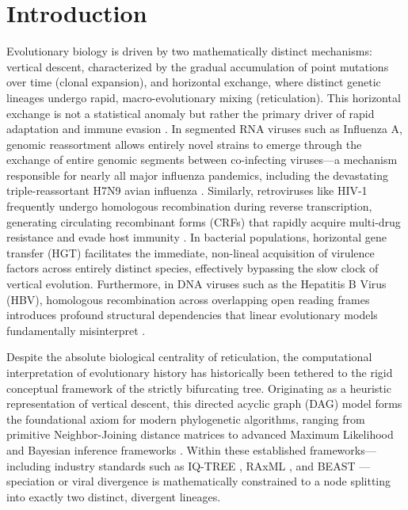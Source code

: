 \section{Introduction}

Evolutionary biology is driven by two mathematically distinct mechanisms: vertical descent, characterized by the gradual accumulation of point mutations over time (clonal expansion), and horizontal exchange, where distinct genetic lineages undergo rapid, macro-evolutionary mixing (reticulation). This horizontal exchange is not a statistical anomaly but rather the primary driver of rapid adaptation and immune evasion \citep{simon2015hiv}. In segmented RNA viruses such as Influenza A, genomic reassortment allows entirely novel strains to emerge through the exchange of entire genomic segments between co-infecting viruses---a mechanism responsible for nearly all major influenza pandemics, including the devastating triple-reassortant H7N9 avian influenza \citep{nelson2014emergence}. Similarly, retroviruses like HIV-1 frequently undergo homologous recombination during reverse transcription, generating circulating recombinant forms (CRFs) that rapidly acquire multi-drug resistance and evade host immunity \citep{simon2015hiv}. In bacterial populations, horizontal gene transfer (HGT) facilitates the immediate, non-lineal acquisition of virulence factors across entirely distinct species, effectively bypassing the slow clock of vertical evolution. Furthermore, in DNA viruses such as the Hepatitis B Virus (HBV), homologous recombination across overlapping open reading frames introduces profound structural dependencies that linear evolutionary models fundamentally misinterpret \citep{zhou2012recombination}.

Despite the absolute biological centrality of reticulation, the computational interpretation of evolutionary history has historically been tethered to the rigid conceptual framework of the strictly bifurcating tree. Originating as a heuristic representation of vertical descent, this directed acyclic graph (DAG) model forms the foundational axiom for modern phylogenetic algorithms, ranging from primitive Neighbor-Joining distance matrices to advanced Maximum Likelihood and Bayesian inference frameworks \citep{felsenstein1981evolutionary, nguyen2015iq, stamatakis2014raxml, suchard2018bayesian}. Within these established frameworks---including industry standards such as IQ-TREE \citep{nguyen2015iq}, RAxML \citep{stamatakis2014raxml}, and BEAST \citep{suchard2018bayesian}---speciation or viral divergence is mathematically constrained to a node splitting into exactly two distinct, divergent lineages. 

